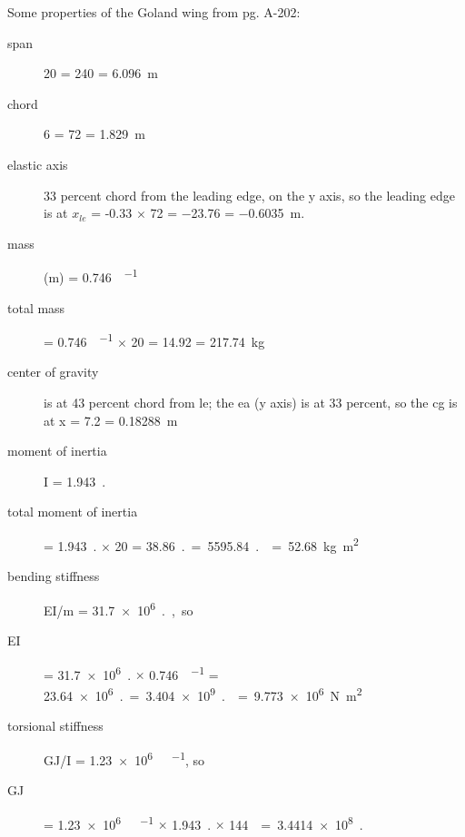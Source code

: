 \documentclass[10pt,openany,twoside]{book}
\numberwithin{equation}{section}   %
\let\US\SI
\begin{document}
Some properties of the Goland wing from \cite{goland1945flutter} pg. A-202:
\begin{description}
\item[span] \US{20}{\ft} = \US{240}{\inch} = \SI{6.096}{m}
\item[chord] \US{6}{\ft} = \US{72}{\inch} = \SI{1.829}{m}
\item[elastic axis] 33 percent chord from the leading edge, on the y axis, so
	the leading edge is at
	\newline
	$x_{le}$ = -0.33 $\times$ \qty{72}{\inch} = \qty{-23.76}{\inch} = \qty{-0.6035}{\m}.
\item[mass] (m) = \qty[per-mode = symbol]{0.746}{\slug\per\ft}
\item[total mass] = \qty[per-mode = symbol]{0.746}{\slug\per\ft}
		$\times$ \qty{20}{\ft} = \qty{14.92}{\slug} = \qty{217.74}{\kg}

\item[center of gravity] is at 43 percent chord from le; the ea (y axis) is at
	33 percent, so the cg is at x = \US{7.2}{\inch} = \SI{0.18288}{m}

\item[moment of inertia] I = \qty[per-mode = symbol]{1.943}{\slug.\square\ft\per\ft}
\item[total moment of inertia] = \qty[per-mode = symbol]{1.943}{\slug.\square\ft\per\ft}
	$\times$ \qty{20}{\ft} = \qty[per-mode = symbol]{38.86}{\slug.\square\ft}
	= \qty[per-mode = symbol]{5595.84}{\slug.\square\inch}
	\newline = \qty{52.68}{\kg\square\meter}

\item[bending stiffness] EI/m = \US{31.7e+6}{\lb.\cubic\ft\per\slug}, so
\item[EI] = \US{31.7e+6}{\lb.\cubic\ft\per\slug}
		$\times$ \qty[per-mode = symbol]{0.746}{\slug\per\ft}
		= \US{23.64e+6}{\lb.\square\ft}
		= \US{3.404e+9}{\lb.\square\inch}
		\newline = \qty{9.773e+6}{\N.\square\m}
\item[torsional stiffness] GJ/I = \US{1.23e+6}{\lb.\ft\per\slug}, so
\item[GJ] = \qty[per-mode = symbol]{1.23e+6}{\lb.\ft\per\slug}
		$\times$ \qty[per-mode=symbol]{1.943}{\slug.\square\ft\per\ft}
		$\times$ \qty[per-mode=symbol]{144}{\square\inch\per\square\ft}
		= \US{3.4414e+8}{\lb.\square\inch}


\end{description}
\end{document}
